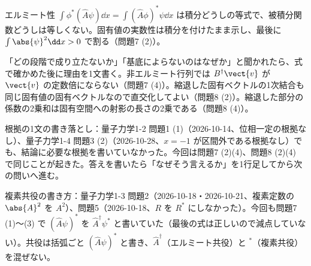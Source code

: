\documentclass[uplatex,dvipdfmx,a4paper,11pt]{jsarticle}
\begin{document}
\matome
\begin{saitenichiran}
\end{saitenichiran}
\begin{daiji}
  \item エルミート性 $\int\phi^{*}(\hat{A}\psi)\dd x=\int(\hat{A}\phi)^{*}\psi\dd x$ は積分どうしの等式で、被積分関数どうしは等しくない。固有値の実数性は積分を付けたまま示し、最後に $\int\abs{\psi}^{2}\dd x>0$ で割る（問題7 (2)）。
  \item 「どの段階で成り立たないか」「基底によらないのはなぜか」と聞かれたら、式で確かめた後に理由を1文書く。非エルミート行列では $B^{\dagger}\vect{v}$ が $\vect{v}$ の定数倍にならない（問題7 (4)）。縮退した固有ベクトルの1次結合も同じ固有値の固有ベクトルなので直交化してよい（問題8 (2)）。縮退した部分の係数の2乗和は固有空間への射影の長さの2乗である（問題8 (4)）。
\end{daiji}
\begin{maemo}
  \item 根拠の1文の書き落とし：量子力学1-2 問題1 (1)（2026-10-14、位相一定の根拠なし）、量子力学1-4 問題3 (2)（2026-10-28、$x=-1$ が区間外である根拠なし）でも、結論に必要な根拠を書いていなかった。今回は問題7 (2)(4)、問題8 (2)(4) で同じことが起きた。答えを書いたら「なぜそう言えるか」を1行足してから次の問いへ進む。
  \item 複素共役の書き方：量子力学1-3 問題2（2026-10-18・2026-10-21、複素定数の $\abs{A}^{2}$ を $A^{2}$）、問題5（2026-10-18、$R$ を $R^{*}$ にしなかった）。今回も問題7 (1)〜(3) で $(\hat{A}\psi)^{*}$ を $\hat{A}^{\dagger}\psi^{*}$ と書いていた（最後の式は正しいので減点していない）。共役は括弧ごと $(\hat{A}\psi)^{*}$ と書き、$\hat{A}^{\dagger}$（エルミート共役）と $^{*}$（複素共役）を混ぜない。
\end{maemo}
\end{document}
